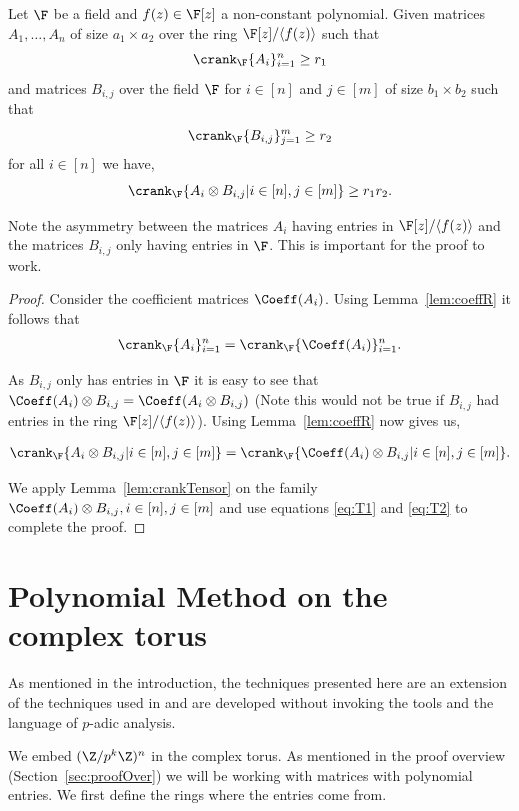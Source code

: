 \begin{lem}\label{lem:crankTensorProduct}
Let $\F$ be a field and $f(z)\in \F[z]$ a non-constant polynomial. Given matrices $A_1,\hdots,A_n$ of size $a_1\times a_2$ over the ring $\F[z]/\langle f(z)\rangle$ such that 
{\em$$\crank_\F\{A_i\}_{i=1}^n\ge r_1$$} 
and matrices $B_{i,j}$ over the field $\F$ for $i\in [n]$ and $j\in [m]$ of size $b_1\times b_2$ such that 
{\em $$\crank_\F\{B_{i,j}\}_{j=1}^m\ge r_2$$}
for all $i\in [n]$ we have,
\em{$$\crank_\F\{A_i\otimes B_{i,j}|i\in [n],j\in[m]\}\ge r_1r_2.$$}
\end{lem}
Note the asymmetry between the matrices $A_i$ having entries in $\F[z]/\langle f(z)\rangle$ and the matrices $B_{i,j}$ only having entries in $\F$. This is important for the proof to work.
\begin{proof}
Consider the coefficient matrices $\Coeff(A_i)$. Using Lemma~\ref{lem:coeffR} it follows that 
\begin{align}\label{eq:T1}
    \crank_\F\{A_i\}_{i=1}^n=\crank_\F\{\Coeff(A_i)\}_{i=1}^n.
\end{align}

As $B_{i,j}$ only has entries in $\F$ it is easy to see that $\Coeff(A_i)\otimes B_{i,j}=\Coeff(A_i\otimes B_{i,j})$ (Note this would not be true if $B_{i,j}$ had entries in the ring $\F[z]/\langle f(z)\rangle$). Using Lemma~\ref{lem:coeffR} now gives us,

\begin{align}\label{eq:T2}
    \crank_\F\{A_i\otimes B_{i,j}|i\in [n],j\in[m]\}=\crank_\F\{\Coeff(A_i)\otimes B_{i,j}|i\in [n],j\in[m]\}.
\end{align}

We apply Lemma~\ref{lem:crankTensor} on the family $\Coeff(A_i)\otimes B_{i,j},i\in [n],j\in[m]$ and use equations \eqref{eq:T1} and \eqref{eq:T2} to complete the proof.
\end{proof}

\section{Polynomial Method on the complex torus}\label{sec:PreAr}
As mentioned in the introduction, the techniques presented here are an extension of the techniques used in \cite{arsovski2021padic} and are developed without invoking the tools and the language of $p$-adic analysis.

We embed $(\Z/p^k\Z)^n$ in the complex torus. As mentioned in the proof overview (Section~\ref{sec:proofOver}) we will be working with matrices with polynomial entries. We first define the rings where the entries come from.

